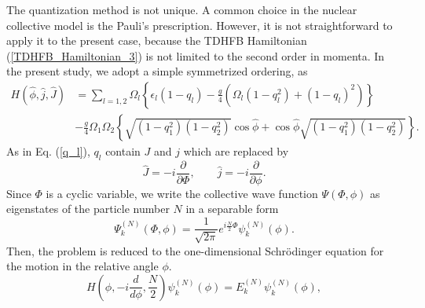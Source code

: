 \documentclass[%
superscriptaddress,
preprint,
showpacs,
nofootinbib,
amsmath,amssymb,
prc,
floatfix ]%
{revtex4-1}
\begin{document}
The quantization method is not unique.
A common choice in the nuclear collective model is the Pauli's prescription.
However, it is not straightforward to apply it to the present case, 
because the TDHFB Hamiltonian (\ref{TDHFB_Hamiltonian_3})
is not limited to the second order in momenta.
In the present study, we adopt a simple symmetrized ordering, as
\begin{align}
	H(\hat{\phi},\hat{j},\hat{J})
	&= \sum_{l=1,2} \Omega_l \left\{ \epsilon_l (1-q_l) 
	- \frac{g}{4} (\Omega_l(1-q_l^2)+(1-q_l)^2) \right\}
	\nonumber \\
	&- \frac{g}{4}\Omega_{1}\Omega_{2}
	\left\{ \sqrt{(1-q_{1}^2)(1-q_{2}^2)}\cos{\hat{\phi}}
	+ \cos{\hat{\phi}}\sqrt{(1-q_{1}^2)(1-q_{2}^2)} \right\} .
\label{canonical_quantized_H}
\end{align}
As in Eq. (\ref{q_l}), $q_l$ contain $J$ and $j$ which
are replaced by
\begin{equation}
	\hat{J} = -i\frac{\partial}{\partial\Phi},\quad\quad
	\hat{j} = -i\frac{\partial}{\partial\phi} .
\end{equation}
Since $\Phi$ is a cyclic variable, 
we write the collective wave function $\Psi(\Phi,\phi)$ as eigenstates
of the particle number $N$ in a separable form
\begin{equation}
  \Psi_k^{(N)}(\Phi,\phi) = 
	\frac{1}{\sqrt{2\pi}}e^{i\frac{N}{2}\Phi}\psi_k^{(N)}(\phi) .
\end{equation}
Then, the problem is reduced to the one-dimensional Schr\"{o}dinger
equation for the motion in the relative angle $\phi$.
\begin{equation}
	H\left( \phi,-i\frac{d}{d\phi},\frac{N}{2} \right)
	\psi_k^{(N)}(\phi) = E_k^{(N)}\psi_k^{(N)}(\phi),
	\label{Schroedinger_eq}
\end{equation}
\end{document}
